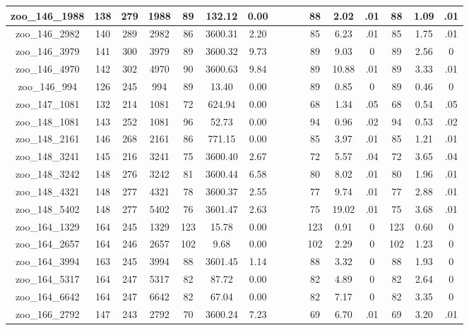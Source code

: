 \begin{landscape}
\begin{longtable}{|c|c|c|c|c|c|c|c|c|c|c|c|c|c|c|c|}
zoo\_146\_1988 & 138 & 279 & 1988 & 89 & 132.12 & 0.00 &  &  &  & 88 & 2.02 & .01 & 88 & 1.09 & .01 \\ \hline 
zoo\_146\_2982 & 140 & 289 & 2982 & 86 & 3600.31 & 2.20 &  &  &  & 85 & 6.23 & .01 & 85 & 1.75 & .01 \\ \hline 
zoo\_146\_3979 & 141 & 300 & 3979 & 89 & 3600.32 & 9.73 &  &  &  & 89 & 9.03 & 0 & 89 & 2.56 & 0 \\ \hline 
zoo\_146\_4970 & 142 & 302 & 4970 & 90 & 3600.63 & 9.84 &  &  &  & 89 & 10.88 & .01 & 89 & 3.33 & .01 \\ \hline 
zoo\_146\_994 & 126 & 245 & 994 & 89 & 13.40 & 0.00 &  &  &  & 89 & 0.85 & 0 & 89 & 0.46 & 0 \\ \hline 
zoo\_147\_1081 & 132 & 214 & 1081 & 72 & 624.94 & 0.00 &  &  &  & 68 & 1.34 & .05 & 68 & 0.54 & .05 \\ \hline 
zoo\_148\_1081 & 143 & 252 & 1081 & 96 & 52.73 & 0.00 &  &  &  & 94 & 0.96 & .02 & 94 & 0.53 & .02 \\ \hline 
zoo\_148\_2161 & 146 & 268 & 2161 & 86 & 771.15 & 0.00 &  &  &  & 85 & 3.97 & .01 & 85 & 1.21 & .01 \\ \hline 
zoo\_148\_3241 & 145 & 216 & 3241 & 75 & 3600.40 & 2.67 &  &  &  & 72 & 5.57 & .04 & 72 & 3.65 & .04 \\ \hline 
zoo\_148\_3242 & 148 & 276 & 3242 & 81 & 3600.44 & 6.58 &  &  &  & 80 & 8.02 & .01 & 80 & 1.96 & .01 \\ \hline 
zoo\_148\_4321 & 148 & 277 & 4321 & 78 & 3600.37 & 2.55 &  &  &  & 77 & 9.74 & .01 & 77 & 2.88 & .01 \\ \hline 
zoo\_148\_5402 & 148 & 277 & 5402 & 76 & 3601.47 & 2.63 &  &  &  & 75 & 19.02 & .01 & 75 & 3.68 & .01 \\ \hline 
zoo\_164\_1329 & 164 & 245 & 1329 & 123 & 15.78 & 0.00 &  &  &  & 123 & 0.91 & 0 & 123 & 0.60 & 0 \\ \hline 
zoo\_164\_2657 & 164 & 246 & 2657 & 102 & 9.68 & 0.00 &  &  &  & 102 & 2.29 & 0 & 102 & 1.23 & 0 \\ \hline 
zoo\_164\_3994 & 163 & 245 & 3994 & 88 & 3601.45 & 1.14 &  &  &  & 88 & 3.32 & 0 & 88 & 1.93 & 0 \\ \hline 
zoo\_164\_5317 & 164 & 247 & 5317 & 82 & 87.72 & 0.00 &  &  &  & 82 & 4.89 & 0 & 82 & 2.64 & 0 \\ \hline 
zoo\_164\_6642 & 164 & 247 & 6642 & 82 & 67.04 & 0.00 &  &  &  & 82 & 7.17 & 0 & 82 & 3.35 & 0 \\ \hline 
zoo\_166\_2792 & 147 & 243 & 2792 & 70 & 3600.24 & 7.23 &  &  &  & 69 & 6.70 & .01 & 69 & 3.20 & .01 \\ \hline 

\end{longtable}
\end{landscape}
